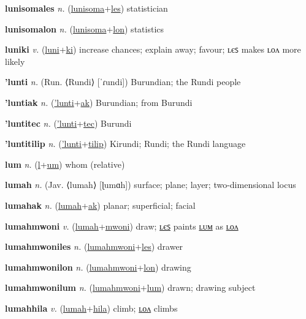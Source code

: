 \textbf{\hypertarget{lunisomales}{lunisomales}} \textit{n.} (\hyperlink{lunisoma}{lunisoma}+\allowbreak \hyperlink{les}{les})
statistician

\textbf{\hypertarget{lunisomalon}{lunisomalon}} \textit{n.} (\hyperlink{lunisoma}{lunisoma}+\allowbreak \hyperlink{lon}{lon})
statistics

\textbf{\hypertarget{luniki}{luniki}} \textit{v.} (\hyperlink{luni}{luni}+\allowbreak \hyperlink{ki}{ki})
increase chances; explain away; favour; ʟєꜱ makes ʟᴏᴧ more likely

\textbf{\hypertarget{'lunti}{'lunti}} \textit{n.} (Run. ⟨Rundi⟩ [ˈɾundi])
Burundian; the Rundi people

\textbf{\hypertarget{'luntiak}{'luntiak}} \textit{n.} (\hyperlink{'lunti}{'lunti}+\allowbreak \hyperlink{ak}{ak})
Burundian; from Burundi

\textbf{\hypertarget{'luntitec}{'luntitec}} \textit{n.} (\hyperlink{'lunti}{'lunti}+\allowbreak \hyperlink{tec}{tec})
Burundi

\textbf{\hypertarget{'luntitilip}{'luntitilip}} \textit{n.} (\hyperlink{'lunti}{'lunti}+\allowbreak \hyperlink{tilip}{tilip})
Kirundi; Rundi; the Rundi language

\textbf{\hypertarget{lum}{lum}} \textit{n.} (\hyperlink{l}{l}+\allowbreak \hyperlink{um}{um})
whom (relative)

\textbf{\hypertarget{lumah}{lumah}} \textit{n.} (Jav. ⟨lumah⟩ [ɭumɑh])
surface; plane; layer; two-dimensional locus

\textbf{\hypertarget{lumahak}{lumahak}} \textit{n.} (\hyperlink{lumah}{lumah}+\allowbreak \hyperlink{ak}{ak})
planar; superficial; facial

\textbf{\hypertarget{lumahmwoni}{lumahmwoni}} \textit{v.} (\hyperlink{lumah}{lumah}+\allowbreak \hyperlink{mwoni}{mwoni})
draw; \hyperlink{lumahmwoniles}{ʟєꜱ} paints \hyperlink{lumahmwonilum}{ʟᴜᴍ} as \hyperlink{lumahmwonilon}{ʟᴏᴧ}

\textbf{\hypertarget{lumahmwoniles}{lumahmwoniles}} \textit{n.} (\hyperlink{lumahmwoni}{lumahmwoni}+\allowbreak \hyperlink{les}{les})
drawer

\textbf{\hypertarget{lumahmwonilon}{lumahmwonilon}} \textit{n.} (\hyperlink{lumahmwoni}{lumahmwoni}+\allowbreak \hyperlink{lon}{lon})
drawing

\textbf{\hypertarget{lumahmwonilum}{lumahmwonilum}} \textit{n.} (\hyperlink{lumahmwoni}{lumahmwoni}+\allowbreak \hyperlink{lum}{lum})
drawn; drawing subject

\textbf{\hypertarget{lumahhila}{lumahhila}} \textit{v.} (\hyperlink{lumah}{lumah}+\allowbreak \hyperlink{hila}{hila})
climb; \hyperlink{lumahhilalon}{ʟᴏᴧ} climbs

